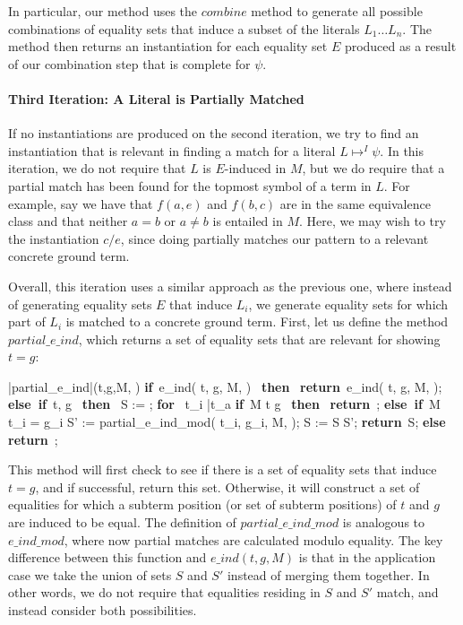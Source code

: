 \documentclass{llncs}
\def\IF{\qtab\keyword{if}\ }
\def\THEN{\ \keyword{then}\ }
\def\ELSE{\untab\qtab\keyword{else}\ }
\def\ELSEIF{\untab\qtab\keyword{else if}\ }
\def\FI{\untab}
\def\RETURN{\keyword{return}\ }
\def\ENDPROC{\untab}
\def\DOFOR{\qtab\keyword{for}\ }
\def\ENDFOR{\untab}
\def\keyword#1{\mbox{\normalshape\bf #1}}
\begin{document}
In particular, our method uses the $combine$ method to generate all possible combinations of equality sets that induce a subset of the literals $L_1 \ldots L_n$.
The method then returns an instantiation for each equality set $E$ produced as a result of our combination step that is complete for $\psi$.

\paragraph{Third Iteration: A Literal is Partially Matched}

If no instantiations are produced on the second iteration, we try to find an instantiation that is relevant in finding a match for a literal $L \mapsto^I \psi$.
In this iteration, we do not require that $L$ is $E$-induced in $M$, but we do require that a partial match has been found for the topmost symbol of a term in $L$.
For example, say we have that $f( a, e )$ and $f( b, c )$ are in the same equivalence class and that neither $a = b$ or $a \neq b$ is entailed in $M$.  
Here, we may wish to try the instantiation $c/e$, since doing partially matches our pattern to a relevant concrete ground term.

Overall, this iteration uses a similar approach as the previous one, where instead of generating equality sets $E$ that induce $L_i$, we generate equality sets for which part of $L_i$ is matched to a concrete ground term.
First, let us define the method $partial\_e\_ind$, which returns a set of equality sets that are relevant for showing $t = g$:

\begin{minipage}[t]{.4\linewidth}
\begin{program}
\PROC |partial\_e\_ind|(t,g,M, \psi) \BODY
\IF e\_ind( t, g, M, \psi ) \neq \emptyset \THEN
  \RETURN e\_ind( t, g, M, \psi );
\ELSEIF t, g  \THEN
  S := \emptyset;
  \DOFOR {} t_i  \bar{t_a} 
    \IF M \models t \neq g \THEN
      \RETURN \emptyset;
    \ELSEIF M \not\models t_i = g_i
      S' := partial\_e\_ind\_mod( t_i, g_i, M, \psi );
      S := S \cup S';
    \FI
  \ENDFOR
  \RETURN S;
\ELSE
  \RETURN \emptyset;
\FI
\ENDPROC
\end{program}
\end{minipage}

This method will first check to see if there is a set of equality sets that induce $t = g$, and if successful, return this set.
Otherwise, it will construct a set of equalities for which a subterm position (or set of subterm positions) of $t$ and $g$ are induced to be equal.
The definition of $partial\_e\_ind\_mod$ is analogous to $e\_ind\_mod$, where now partial matches are calculated modulo equality.
The key difference between this function and $e\_ind( t, g, M )$ is that in the application case we take the union of sets $S$ and $S'$ instead of merging them together.
In other words, we do not require that equalities residing in $S$ and $S'$ match, and instead consider both possibilities.
\end{document}
